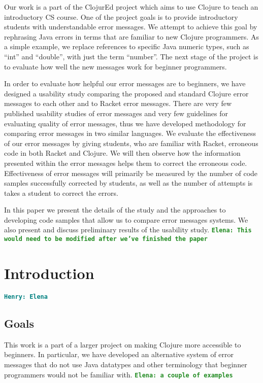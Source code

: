 \documentclass[12pt]{article}
\newcommand{\comment}[1]{{\bf \tt  {#1}}}
\newcommand{\emcomment}[1]{\textcolor{ForestGreen}{\comment{Elena: {#1}}}}
\newcommand{\hfcomment}[1]{\textcolor{Teal}{\comment{Henry: {#1}}}}
\begin{document}
Our work is a part of the ClojurEd project which aims to use Clojure to teach an introductory CS course. One of the project goals is to provide introductory students with understandable error messages. We attempt to achieve this goal by rephrasing Java errors in terms that are familiar to new Clojure programmers. As a simple example, we replace references to specific Java numeric types, such as “int” and “double”, with just the term “number”. The next stage of the project is to evaluate how well the new messages work for beginner programmers. 

In order to evaluate how helpful our error messages are to beginners, we have designed a usability study comparing the proposed and standard Clojure error messages to each other and to Racket error messages. There are very few published usability studies of error messages and very few guidelines for evaluating quality of error messages, thus we have developed methodology for comparing error messages in two similar languages. We evaluate the effectiveness of our error messages by giving students, who are familiar with Racket, erroneous code in both Racket and Clojure. We will then observe how the information presented within the error messages helps them to correct the erroneous code. Effectiveness of error messages will primarily be measured by the number of code samples successfully corrected by students, as well as the number of attempts is takes a student to correct the errors. 

In this paper we present the details of the study and the approaches to developing code samples that allow us to compare error messages systems. We also present and discuss preliminary results of the usability study. 
\emcomment{This would need to be modified after we've finished the paper}
\newpage
\setcounter{page}{1}

\section{Introduction}\label{sec:intro}
	\hfcomment{Elena}

	\subsection{Goals}\label{sec:goals}
This work is a part of a larger project on making Clojure more accessible to beginners. In particular, we have developed an alternative system of error messages that do not use Java datatypes and other terminology that beginner programmers would not be familiar with. 
\emcomment{a couple of examples}
\end{document}
